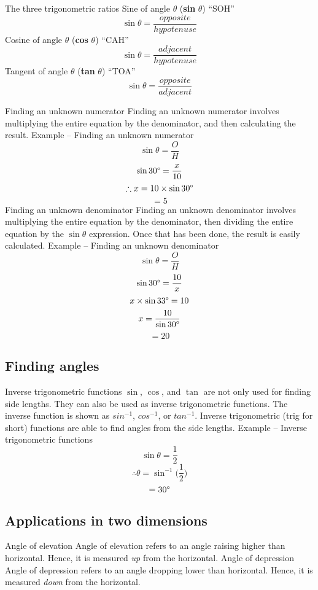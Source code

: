 \begin{outline}
\begin{center}
\begin{tikzpicture}[thick]
\end{tikzpicture}
\end{center}

	\1 The three trigonometric ratios
		\2 Sine of angle $\theta$ (\textbf{sin} $\theta$)
			\3 ``SOH''
				\[\sin{\theta} = \frac{opposite}{hypotenuse}\]
		\2 Cosine of angle $\theta$ (\textbf{cos} $\theta$)
			\3 ``CAH''
				\[\sin{\theta} = \frac{adjacent}{hypotenuse}\]
		\2 Tangent of angle $\theta$ (\textbf{tan} $\theta$)
			\3 ``TOA''
				\[\sin{\theta} = \frac{opposite}{adjacent}\]

	\1 Finding an unknown numerator
		\2 Finding an unknown numerator involves multiplying the entire equation by the denominator, and then calculating the result.
			\3 Example -- Finding an unknown numerator
				\[\sin \theta = \frac{O}{H}\]
				\[\sin 30\degree = \frac{x}{10}\]
				\[\therefore x = 10 \times \sin 30\degree \]
				\[= 5\]
	\1 Finding an unknown denominator
		\2 Finding an unknown denominator involves multiplying the entire equation by the denominator, then dividing the entire equation by the $\sin\theta$ expression. Once that has been done, the result is easily calculated.
			\3 Example -- Finding an unknown denominator
				\[\sin\theta = \frac{O}{H}\]
				\[\sin 30\degree = \frac{10}{x}\]
				\[x \times \sin 33\degree = 10\]
				\[x = \frac{10}{\sin 30\degree}\]
				\[= 20\]

\0
\subsection{Finding angles}
	\1 Inverse trigonometric functions
		\2 $\sin$, $\cos$, and $\tan$ are not only used for finding side lengths. They can also be used as inverse trigonometric functions. The inverse function is shown as $sin^{-1}$, $cos^{-1}$, or $tan^{-1}$. Inverse trigonometric (trig for short) functions are able to find angles from the side lengths.
			\3 Example -- Inverse trigonometric functions
				\[\sin\theta = \frac{1}{2}\]
				\[\therefore \theta = \sin^{-1}\bigg(\frac{1}{2}\bigg)\]
				\[= 30\degree\]

\0
\subsection{Applications in two dimensions}
	\1 Angle of elevation
		\2 Angle of elevation refers to an angle raising higher than horizontal. Hence, it is measured \textit{up} from the horizontal.
	\1 Angle of depression
		\2 Angle of depression refers to an angle dropping lower than horizontal. Hence, it is measured \textit{down} from the horizontal.


\end{outline}
